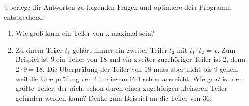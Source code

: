 \begin{aufgabe}
	Überlege dir Antworten zu folgenden Fragen und optimiere dein Programm entsprechend:
	\begin{enumerate}[label=\alph*), itemsep=0ex, parsep=0ex]
		\item Wie groß kann ein Teiler von x maximal sein?
		\item Zu einem Teiler $t_1$ gehört immer ein zweiter Teiler $t_2$ mit $t_1 \cdot t_2 = x$. Zum Beispiel ist $9$ ein Teiler von $18$ und ein zweiter zugehöriger Teiler ist $2$, denn $2\cdot 9 = 18$. Die Überprüfung der Teiler von 18 muss aber nicht bis 9 gehen, weil die Überprüfung der 2 in diesem Fall schon ausreicht. Wie groß ist der größte Teiler, der nicht schon durch einen zugehörigen kleineren Teiler gefunden werden kann? Denke zum Beispiel an die Teiler von 36.
	\end{enumerate}
\end{aufgabe}


